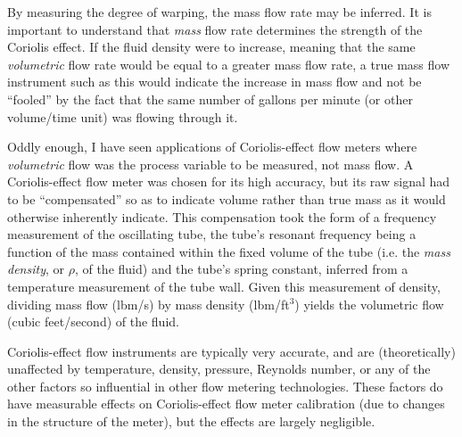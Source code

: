 By measuring the degree of warping, the mass flow rate may be inferred.  It is important to understand that {\it mass} flow rate determines the strength of the Coriolis effect.  If the fluid density were to increase, meaning that the same {\it volumetric} flow rate would be equal to a greater mass flow rate, a true mass flow instrument such as this would indicate the increase in mass flow and not be ``fooled'' by the fact that the same number of gallons per minute (or other volume/time unit) was flowing through it.

Oddly enough, I have seen applications of Coriolis-effect flow meters where {\it volumetric} flow was the process variable to be measured, not mass flow.  A Coriolis-effect flow meter was chosen for its high accuracy, but its raw signal had to be ``compensated'' so as to indicate volume rather than true mass as it would otherwise inherently indicate.  This compensation took the form of a frequency measurement of the oscillating tube, the tube's resonant frequency being a function of the mass contained within the fixed volume of the tube (i.e. the {\it mass density}, or $\rho$, of the fluid) and the tube's spring constant, inferred from a temperature measurement of the tube wall.  Given this measurement of density, dividing mass flow (lbm/s) by mass density (lbm/ft$^{3}$) yields the volumetric flow (cubic feet/second) of the fluid.

Coriolis-effect flow instruments are typically very accurate, and are (theoretically) unaffected by temperature, density, pressure, Reynolds number, or any of the other factors so influential in other flow metering technologies.  These factors do have measurable effects on Coriolis-effect flow meter calibration (due to changes in the structure of the meter), but the effects are largely negligible.











